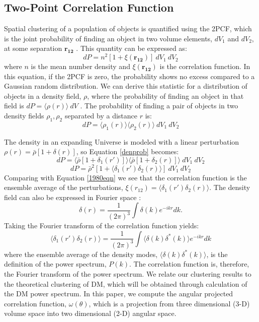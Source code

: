 \documentclass[apj, numberedappendix]{emulateapj}
\begin{document}
 \subsection{Two-Point Correlation Function}
 Spatial clustering of a population of objects is quantified using the 2PCF, which is the joint probability of finding an object in two volume elements, $dV_1$ and $dV_2$, at some separation $\mathbf{r_{12}}$ \citep{Peebles1980}. This quantity can be expressed as:
 \begin{equation}\label{1980eqn}
 dP = n^2[1+\xi(\mathbf{r_{12}})]\ dV_1\ dV_2
 \end{equation}
where $n$ is the mean number density and $\xi(\mathbf{r_{12}})$ is the correlation function. In this equation, if the 2PCF is zero, the probability shows no excess compared to a Gaussian random distribution. We can derive this statistic for a distribution of objects in a density field, $\rho$, where the probability of finding an object in that field is $dP = \langle\rho(r)\rangle\ dV$ \citep{Peebles1980}. The probability of finding a pair of objects in two density fields $\rho_1, \rho_2$ separated by a distance $r$ is:
 \begin{equation}\label{denprob}
 dP = \langle\rho_1(r)\rangle \langle\rho_2(r)\rangle\ dV_1\ dV_2
 \end{equation}

The density in an expanding Universe is modeled with a linear perturbation $\rho(r) = \bar{\rho}[1+\delta(r)]$, so Equation \eqref{denprob} becomes:
 \begin{equation}
  dP = \langle\bar{\rho}[1+\delta_1(r')]\rangle \langle\bar{\rho}[1+\delta_2(r)]\rangle\ dV_1\ dV_2 
 \end{equation}
 \begin{equation}
  dP = \bar{\rho}^2 [1+\langle \delta_1(r') \delta_2(r)\rangle]\ dV_1\ dV_2
 \end{equation}
 Comparing with Equation \eqref{1980eqn} we see that the correlation function is the ensemble average of the perturbations, $\xi(r_{12}) = \langle \delta_1(r') \delta_2(r)\rangle$. The density field can also be expressed in Fourier space \citep{Bonometto2002}:
 \begin{equation}
 \delta(r) = \frac{1}{(2\pi)^3}\int \delta(k) e^{-ikr}dk.
 \end{equation}
Taking the Fourier transform of the correlation function yields:
 \begin{equation}
 \langle \delta_1(r') \delta_2(r)\rangle = \frac{1}{(2\pi)^3}\int \langle\delta(k)\delta^*(k)\rangle e^{-ikr}dk
 \end{equation}
where the ensemble average of the density modes, $\langle\delta(k)\delta^*(k)\rangle$, is the definition of the power spectrum, $P(k)$. The correlation function is, therefore, the Fourier transform of the power spectrum.  We relate our clustering results to the theoretical clustering of DM, which will be obtained through calculation of the DM power spectrum. In this paper, we compute the angular projected correlation function, $\omega(\theta)$, which is a projection from three dimensional (3-D) volume space into two dimensional (2-D) angular space.
 
\end{document}
